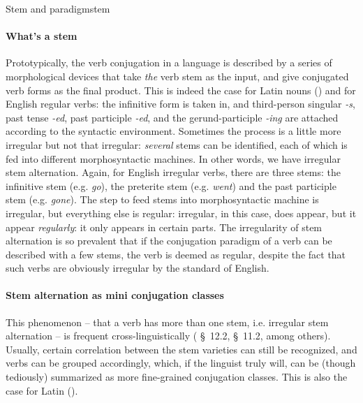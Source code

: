 \documentclass[a4paper, oneside]{report}
\newcommand*{\citesec}[1]{\S~{#1}}
\newcommand{\form}[1]{\emph{#1}}
\begin{document}
\begin{theorybox}{Stem and paradigm}{stem}
    \paragraph*{What's a stem} Prototypically, the verb conjugation in a language is described by 
    a series of morphological devices that take \emph{the} verb stem as the input,
    and give conjugated verb forms as the final product.
    This is indeed the case for Latin nouns ()
    and for English regular verbs:
    the infinitive form is taken in,
    and third-person singular \form{-s}, past tense \form{-ed}, 
    past participle \form{-ed}, and the gerund-participle \form{-ing}
    are attached according to the syntactic environment.
    Sometimes the process is a little more irregular but not that irregular:
    \emph{several} stems can be identified, each of which is fed into different morphosyntactic machines.
    In other words, we have irregular stem alternation.
    Again, for English irregular verbs,
    there are three stems: the infinitive stem (e.g. \form{go}), 
    the preterite stem (e.g. \form{went})
    and the past participle stem (e.g. \form{gone}).
    The step to feed stems into morphosyntactic machine is irregular,
    but everything else is regular:
    irregular, in this case, does appear, but it appear \emph{regularly}:
    it only appears in certain parts.
    The irregularity of stem alternation is so prevalent
    that if the conjugation paradigm of a verb can be described with a few stems,
    the verb is deemed as regular, 
    despite the fact that such verbs are obviously irregular by the standard of English.

    \paragraph*{Stem alternation as mini conjugation classes} 
    This phenomenon -- that a verb has more than one stem, i.e. irregular stem alternation
    -- is frequent cross-linguistically
    (\citealt{jacques2021grammar} \citesec{12.2}, \citealt{forker2020grammar} \citesec{11.2}, among others).
    Usually, certain correlation between the stem varieties can still be recognized,
    and verbs can be grouped accordingly,
    which, if the linguist truly will, 
    can be (though tediously) summarized as more fine-grained conjugation classes.
    This is also the case for Latin ().


\end{theorybox}
\end{document}
